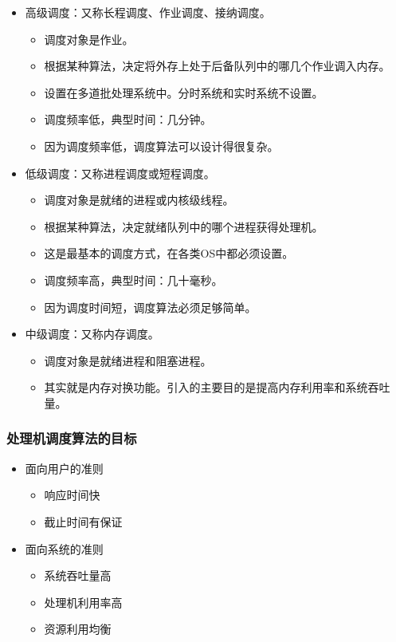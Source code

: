 \documentclass[12pt, a4paper, oneside]{ctexart}
\begin{document}
\begin{itemize}
    \item 高级调度：又称长程调度、作业调度、接纳调度。
    \begin{itemize}
        \item 调度对象是作业。
        \item 根据某种算法，决定将外存上处于后备队列中的哪几个作业调入内存。
        \item 设置在多道批处理系统中。分时系统和实时系统不设置。
        \item 调度频率低，典型时间：几分钟。
        \item 因为调度频率低，调度算法可以设计得很复杂。
    \end{itemize}
    \item 低级调度：又称进程调度或短程调度。
    \begin{itemize}
        \item 调度对象是就绪的进程或内核级线程。
        \item 根据某种算法，决定就绪队列中的哪个进程获得处理机。
        \item 这是最基本的调度方式，在各类OS中都必须设置。
        \item 调度频率高，典型时间：几十毫秒。
        \item 因为调度时间短，调度算法必须足够简单。
    \end{itemize}
    \item 中级调度：又称内存调度。
    \begin{itemize}
        \item 调度对象是就绪进程和阻塞进程。
        \item 其实就是内存对换功能。引入的主要目的是提高内存利用率和系统吞吐量。
    \end{itemize}
\end{itemize}

\subsubsection{处理机调度算法的目标}

\begin{itemize}
    \item 面向用户的准则
    \begin{itemize}
        \item 响应时间快
        \item 截止时间有保证
    \end{itemize}
    \item 面向系统的准则
    \begin{itemize}
        \item 系统吞吐量高
        \item 处理机利用率高
        \item 资源利用均衡
    \end{itemize}
\end{itemize}
\end{document}
